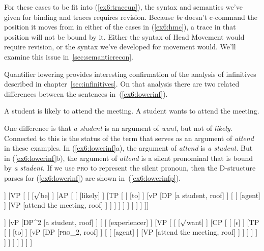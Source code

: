 For these cases to be fit into (\ref{ex6:traceup}), the syntax and semantics we've given for binding and traces requires revision. Because \emph{be} doesn't c-command the position it moves from in either of the cases in (\ref{ex6:hmc}), a trace in that position will not be bound by it. Either the syntax of Head Movement would require revision, or the syntax we've developed for movement would. We'll examine this issue in~\ref{sec:semanticrecon}.

Quantifier lowering provides interesting confirmation of the analysis of infinitives described in chapter~\ref{sec:infinitives}. On that analysis there are two related differences between the sentences in~(\ref{ex6:lowerinf}).
\begin{exe}
\raggedright
	\ex \label{ex6:lowerinf}
	\begin{xlist}
		\ex A student is likely to attend the meeting.
		\ex A student wants to attend the meeting.
	\end{xlist}
\end{exe}
One difference is that \emph{a student} is an argument of \emph{want}, but not of \emph{likely}. Connected to this is the status of the term that serves as an argument of \emph{attend} in these examples. In (\ref{ex6:lowerinf}a), the argument of \emph{attend} is \emph{a student}. But in (\ref{ex6:lowerinf}b), the argument of \emph{attend} is a silent pronominal that is bound by \emph{a student.} If we use \textsc{pro} to represent the silent pronoun, then the D-structure parses for (\ref{ex6:lowerinf}) are shown in~(\ref{ex6:lowerinfp}).
\medskip
\begin{fullwidth}
\begin{exe}
\raggedright
	\ex \label{ex6:lowerinfp}
	\footnotesize
	\begin{forest}
	[TP[\ibar{T}
		[\obar{T} [pres] ]
		[VP [
			[ [$\surd$be] ]
			[AP [
				[ [likely] ]
				[TP [
					[ [to] ]
					[vP
						[DP [a student, roof] ]
						[
							[ [agent] ]
							[VP [attend the meeting, roof] ]
						 ]
					 ]
				] ]
			] ]
		] ]
	]]
	\end{forest}
	\hspace*{-50pt}
	\begin{forest}
	[TP
		[\obar{T} [pres] ]
		[vP 
		[DP^2 [a student, roof] ]
		[
			[ [experiencer] ]
			[VP
				[
					[ ]
					[CP [
						[ [$\epsilon$] ]
						[TP [
							[ [to] ]
							[vP
								[DP [\textsc{pro}_2, roof] ]
								[ 
									[ [agent] ]
									[VP [attend the meeting, roof] ]
								 ]
							 ]
						] ]
					] ]
				 ]
			 ]
		] ]
	]
	\end{forest}
\end{exe}	
\end{fullwidth}
